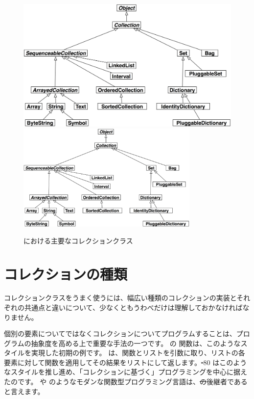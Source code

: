 \documentclass[a4paper,10pt,twoside]{book}
\begin{document}
\begin{figure}
\begin{center}
\ifluluelse
	{\includegraphics[width=\textwidth]{CollectionHierarchy}}
	{\includegraphics[width=0.8\textwidth]{CollectionHierarchy}}
\caption{\pharo における主要なコレクションクラス}
\end{center}
\end{figure}

\section{コレクションの種類}

コレクションクラスをうまく使うには、幅広い種類のコレクションの実装とそれぞれの共通点と違いについて、少なくともうわべだけは理解しておかなければなりません。

個別の要素についてではなくコレクションについてプログラムすることは、プログラムの抽象度を高める上で重要な手法の一つです。
 の  関数は、このようなスタイルを実現した初期の例です。 は、関数とリストを引数に取り、リストの各要素に対して関数を適用してその結果をリストにして返します。\st-80 はこのようなスタイルを推し進め、「コレクションに基づく」プログラミングを中心に据えたのです。 や  のようなモダンな関数型プログラミング言語は、\st の後継者であると言えます。%
\end{document}
